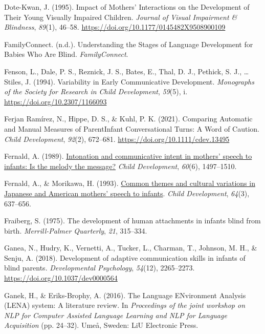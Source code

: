 \documentclass[
  man]{apa6}
\newlength{\cslhangindent}
\newlength{\cslentryspacingunit} %
\newenvironment{CSLReferences}[2] %
 {%
  \setlength{\parindent}{0pt}
  \ifodd #1
  \let\oldpar\par
  \def\par{\hangindent=\cslhangindent\oldpar}
  \fi
  \setlength{\parskip}{#2\cslentryspacingunit}
 }%
 {}
\begin{document}
\begin{CSLReferences}{1}{0}
\leavevmode{}%
Dote-Kwan, J. (1995). Impact of {Mothers}' {Interactions} on the {Development} of {Their Young Visually Impaired Children}. \emph{Journal of Visual Impairment \& Blindness}, \emph{89}(1), 46--58. \url{https://doi.org/10.1177/0145482X9508900109}

\leavevmode{}%
FamilyConnect. (n.d.). Understanding the {Stages} of {Language Development} for {Babies Who Are Blind}. \emph{FamilyConnect}.

\leavevmode{}%
Fenson, L., Dale, P. S., Reznick, J. S., Bates, E., Thal, D. J., Pethick, S. J., \ldots{} Stiles, J. (1994). Variability in {Early Communicative Development}. \emph{Monographs of the Society for Research in Child Development}, \emph{59}(5), i. \url{https://doi.org/10.2307/1166093}

\leavevmode{}%
Ferjan Ramírez, N., Hippe, D. S., \& Kuhl, P. K. (2021). Comparing {Automatic} and {Manual Measures} of {Parent}{\textendash}{Infant Conversational Turns}: {A Word} of {Caution}. \emph{Child Development}, \emph{92}(2), 672--681. \url{https://doi.org/10.1111/cdev.13495}

\leavevmode{}%
Fernald, A. (1989). \href{https://www.ncbi.nlm.nih.gov/pubmed/2612255}{Intonation and communicative intent in mothers' speech to infants: Is the melody the message?} \emph{Child Development}, \emph{60}(6), 1497--1510.

\leavevmode{}%
Fernald, A., \& Morikawa, H. (1993). \href{https://www.ncbi.nlm.nih.gov/pubmed/8339686}{Common themes and cultural variations in {Japanese} and {American} mothers' speech to infants}. \emph{Child Development}, \emph{64}(3), 637--656.

\leavevmode{}%
Fraiberg, S. (1975). The development of human attachments in infants blind from birth. \emph{Merrill-Palmer Quarterly}, \emph{21}, 315--334.

\leavevmode{}%
Ganea, N., Hudry, K., Vernetti, A., Tucker, L., Charman, T., Johnson, M. H., \& Senju, A. (2018). Development of adaptive communication skills in infants of blind parents. \emph{Developmental Psychology}, \emph{54}(12), 2265--2273. \url{https://doi.org/10.1037/dev0000564}

\leavevmode{}%
Ganek, H., \& Eriks-Brophy, A. (2016). The {Language ENvironment Analysis} ({LENA}) system: {A} literature review. In \emph{Proceedings of the joint workshop on {NLP} for {Computer Assisted Language Learning} and {NLP} for {Language Acquisition}} (pp. 24--32). {Ume{å}, Sweden}: {LiU Electronic Press}.


\end{CSLReferences}
\end{document}

